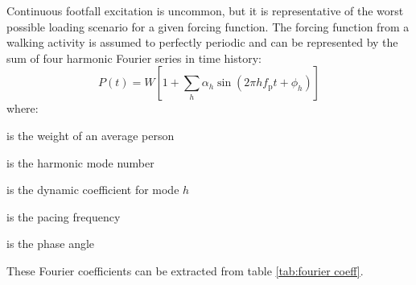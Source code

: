 Continuous footfall excitation is uncommon, but it is representative of the worst possible loading scenario for a given forcing function. The forcing function from a walking activity is assumed to perfectly periodic and can be represented by the sum of four harmonic Fourier series in time history:
\begin{equation}
P(t)=W\left[1+\sum_h\alpha_h \sin(2\pi h f_\mathrm{p} t + \phi_h)\right]
\label{eqn:footfall_SCI}
\end{equation}
where:\par
{}  is the weight of an average person\par
{}  is the harmonic mode number\par
{} is the dynamic coefficient for mode $h$\par
{} is the pacing frequency\par
{} is the phase angle\par
\noindent
These Fourier coefficients can be extracted from table \ref{tab:fourier coeff}.

